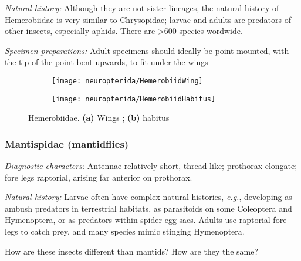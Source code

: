 \noindent{}\textit{Natural history:} Although they are not sister lineages, the natural history of Hemerobiidae is very similar to Chrysopidae; larvae and adults are predators of other insects, especially aphids. There are \textgreater{}600 species wordwide.\vspace{3mm}

\noindent{}\textit{Specimen preparations:} Adult specimens should ideally be point-mounted, with the tip of the point bent upwards, to fit under the wings 

\begin{figure}[ht!]
    \centering
    \begin{subfigure}[ht!]{0.32\textwidth}
        \texttt{[image: neuropterida/HemerobiidWing]}
        \caption{}
        \label{fig:hemerobiid1}
    \end{subfigure}
    \hfill
    \begin{subfigure}[ht!]{0.58\textwidth}
        \texttt{[image: neuropterida/HemerobiidHabitus]}
        \caption{}
        \label{fig:hemerobiid2}
    \end{subfigure}
    \caption{Hemerobiidae. \textbf{(a)} Wings \citep[][Fig. 153]{comstock1918wings}; \textbf{(b)} habitus \citep[modified from][Fig. 38]{bhlitem82061AustrInsect}}\label{fig:hemerobiids}
\end{figure}%

\subsubsection{Mantispidae (mantidflies)}
\noindent{}\textit{Diagnostic characters:} Antennae relatively short, thread-like; prothorax elongate; fore legs raptorial, arising far anterior on prothorax.\vspace{3mm}

\noindent{}\textit{Natural history:} Larvae often have complex natural histories, \textit{e.g.}, developing as ambush predators in terrestrial habitats, as parasitoids on some Coleoptera and Hymenoptera, or as predators within spider egg sacs. Adults use raptorial fore legs to catch prey, and many species mimic stinging Hymenoptera.\vspace{3mm}

\begin{theo}
{}How are these insects different than mantids? How are they the same?
\end{theo}


